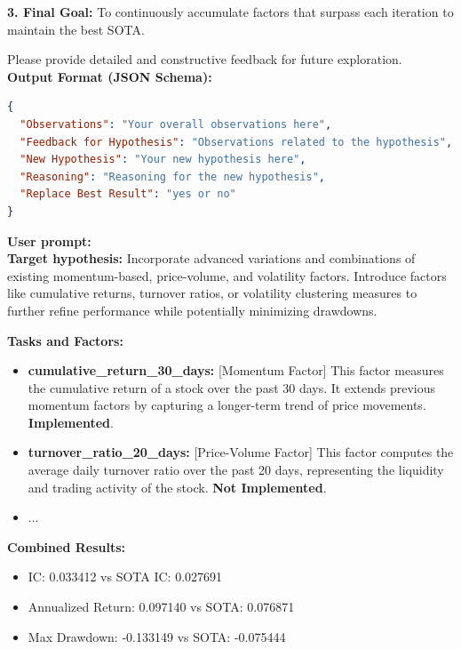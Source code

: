 \documentclass{article}
\begin{document}
\begin{tcolorbox}[
  colback=gray!5, 
  colframe=gray!80,
  title style={fontupper=\bfseries\large},
  title=Analysis Prompt – Factor-Oriented,
  breakable]
\textbf{3. Final Goal:} To continuously accumulate factors that surpass each iteration to maintain the best SOTA.

Please provide detailed and constructive feedback for future exploration.\\

\textbf{Output Format (JSON Schema):}
\begin{lstlisting}[language=json]
{
  "Observations": "Your overall observations here",
  "Feedback for Hypothesis": "Observations related to the hypothesis",
  "New Hypothesis": "Your new hypothesis here",
  "Reasoning": "Reasoning for the new hypothesis",
  "Replace Best Result": "yes or no"
}
\end{lstlisting}

\hrulefill
\vspace{1mm}

\textcolor{blue!60!black}{\textbf{User prompt:}}\\

\textbf{Target hypothesis:  }
Incorporate advanced variations and combinations of existing momentum-based, price-volume, and volatility factors. Introduce factors like cumulative returns, turnover ratios, or volatility clustering measures to further refine performance while potentially minimizing drawdowns.

\textbf{Tasks and Factors:}
\begin{itemize}
  \item \textbf{cumulative\_return\_30\_days:} [Momentum Factor] This factor measures the cumulative return of a stock over the past 30 days. It extends previous momentum factors by capturing a longer-term trend of price movements. \textbf{Implemented}.
  \item \textbf{turnover\_ratio\_20\_days:} [Price-Volume Factor] This factor computes the average daily turnover ratio over the past 20 days, representing the liquidity and trading activity of the stock. \textbf{Not Implemented}.
  \item ...
\end{itemize}


\textbf{Combined Results:}
\begin{itemize}
  \item IC: 0.033412 vs SOTA IC: 0.027691
  \item Annualized Return: 0.097140 vs SOTA: 0.076871
  \item Max Drawdown: -0.133149 vs SOTA: -0.075444\\
\end{itemize}


\end{tcolorbox}
\end{document}
